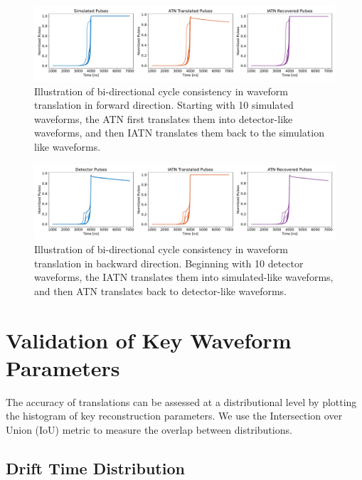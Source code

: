\begin{figure}[htb!]
    \centering
    \includegraphics[width=0.99\linewidth]{ch8/figs/SEP_result_comp_1x3_cycle_BAB.pdf}
    \caption{Illustration of bi-directional cycle consistency in waveform translation in forward direction. Starting with 10 simulated waveforms, the ATN first translates them into detector-like waveforms, and then IATN translates them back to the simulation like waveforms.}
    \label{fig:cycle_bab}
\end{figure}

\begin{figure}[htb!]
    \centering
    \includegraphics[width=0.99\linewidth]{ch8/figs/SEP_result_comp_1x3_cycle_ABA.pdf}
    \caption{Illustration of bi-directional cycle consistency in waveform translation in backward direction. Beginning with 10 detector waveforms, the IATN translates them into simulated-like waveforms, and then ATN translates back to detector-like waveforms.}
    \label{fig:cycle_aba}
\end{figure}

\section{Validation of Key Waveform Parameters}
 The accuracy of translations can be assessed at a distributional level by plotting the histogram of key reconstruction parameters. We use the Intersection over Union (IoU) metric to measure the overlap between distributions.
 
\subsection{Drift Time Distribution}


